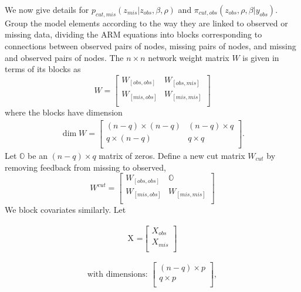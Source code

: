 \documentclass{article}
\begin{document}
We now give details for $p_{cut,mis}(z_{mis}|z_{obs},\beta,\rho)$ and $\pi_{cut,obs}(z_{obs}, \rho, \beta | y_{obs} )$.
Group the model elements according to the way they are linked to observed or missing data, dividing
the ARM equations into blocks corresponding to connections between observed pairs of nodes, missing pairs of nodes, and missing and observed pairs of nodes.
The $n\times n$ network weight matrix $W$ is given in terms of its blocks as
	\begin{equation}
	W=\begin{bmatrix}
		W_{[obs,obs]} & W_{[obs,mis]}\\
		W_{[mis,obs]} & W_{[mis,mis]}\\
	\end{bmatrix}
	\end{equation}
	where the blocks have dimension
	\begin{align*}
	\dim{W}=\begin{bmatrix}
		(n-q)\times(n-q) & (n-q)\times q\\
		q \times (n-q) & q \times q \\	
	\end{bmatrix}.
	\end{align*}
    Let $\mathbb{O}$ be an $(n-q)\times q$ matrix of zeros. Define a new cut matrix $W_{cut}$ by removing feedback from missing to observed,
    \begin{equation}
	W^{cut}=\begin{bmatrix}
		W_{[obs,obs]} & \mathbb{O}\\
		W_{[mis,obs]} & W_{[mis,mis]}\\
	\end{bmatrix}
	\end{equation}
    We block covariates similarly. Let
    \begin{multicols}{2}
		\begin{align*}
		\text{X =}
		\begin{bmatrix}
		X_{obs}\\
		X_{mis}\\
		\end{bmatrix}
		\end{align*}

		\begin{equation}
		\text{with dimensions: }
		\begin{bmatrix}
		(n-q)\times p \\
		q \times p \\
		\end{bmatrix},
		\end{equation}
		
	\end{multicols}	
\end{document}
